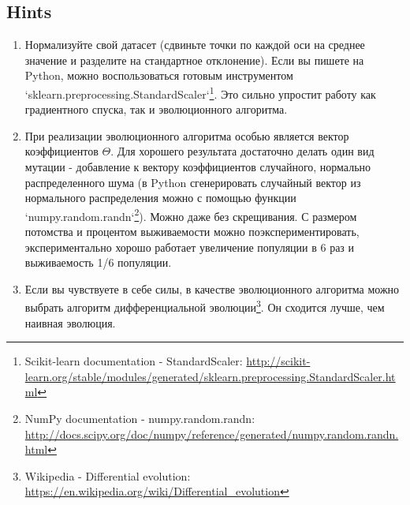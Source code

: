 \documentclass[a4paper, unicode]{article}
\begin{document}
\subsection{Hints}
\label{sec:orgheadline9}
\begin{enumerate}
\item Нормализуйте свой датасет (сдвиньте точки по каждой оси на среднее значение и
разделите на стандартное отклонение). Если вы пишете на Python, можно
воспользоваться готовым инструментом
`sklearn.preprocessing.StandardScaler`\footnote{Scikit-learn documentation - StandardScaler: \url{http://scikit-learn.org/stable/modules/generated/sklearn.preprocessing.StandardScaler.html}}.
Это сильно упростит работу как градиентного спуска, так и эволюционного алгоритма.
\item При реализации эволюционного алгоритма особью является вектор коэффициентов
\(\Theta\). Для хорошего результата достаточно делать один вид мутации -
добавление к вектору коэффициентов случайного, нормально распределенного шума
(в Python сгенерировать случайный вектор из нормального распределения можно с
помощью функции `numpy.random.randn`\footnote{NumPy documentation - numpy.random.randn: \url{http://docs.scipy.org/doc/numpy/reference/generated/numpy.random.randn.html}}). Можно даже без скрещивания. С
размером потомства и процентом выживаемости можно поэкспериментировать,
экспериментально хорошо работает увеличение популяции в 6 раз и выживаемость
1/6 популяции.
\item Если вы чувствуете в себе силы, в качестве эволюционного алгоритма можно
выбрать алгоритм дифференциальной эволюции\footnote{Wikipedia - Differential evolution:
\url{https://en.wikipedia.org/wiki/Differential_evolution}}. Он сходится лучше, чем
наивная эволюция.
\end{enumerate}
\end{document}
